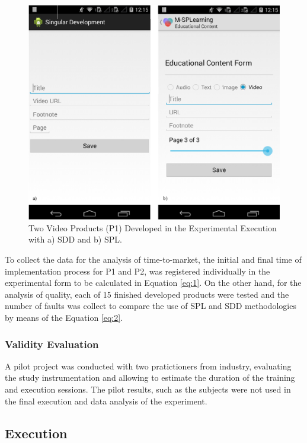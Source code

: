 \begin{figure}[t]
\centering
\includegraphics[scale=0.2]{figures/section4/prod.eps}
\centering
\caption{Two Video Products (P1) Developed in the Experimental Execution with a) SDD and b) SPL.}
\label{fig:prod}
\end{figure}


To collect the data for the analysis of time-to-market, the initial and final time of implementation process for P1 and P2, was registered individually in the experimental form to be calculated in Equation \ref{eq:1}. On the other hand, for the analysis of quality, each of 15 finished developed products were tested and the number of faults was collect to compare the use of SPL and SDD methodologies by means of the Equation \ref{eq:2}.


\subsubsection{Validity Evaluation}

A pilot project was conducted with two pratictioners from industry, evaluating the study instrumentation and allowing to estimate the duration of the training and execution sessions. The pilot results, such as the subjects were not used in the final execution and data analysis of the experiment.


\subsection{Execution}\label{sub:execution}

